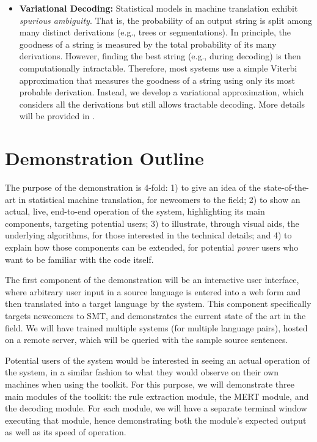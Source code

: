 \documentclass[11pt]{article}
\begin{document}
\begin{itemize}
\item \textbf{Variational Decoding:} Statistical models in machine translation exhibit \emph{spurious ambiguity}. That is, the probability of an output string is split among many distinct derivations (e.g., trees or segmentations).  In principle, the goodness of a string is measured by the total probability of its many derivations.  However, finding the best string (e.g., during decoding) is then computationally intractable. Therefore, most systems use a simple Viterbi approximation that measures the goodness of a string using only its most probable derivation.  Instead, we develop a variational approximation, which considers all the derivations but still allows tractable decoding.  More details will be provided in .
\end{itemize}

\section{Demonstration Outline}

The purpose of the demonstration is 4-fold: 1) to give an idea of the
state-of-the-art in statistical machine translation, for newcomers to the
field; 2) to show an actual, live, end-to-end operation of the system,
highlighting its main components, targeting potential users; 3) to illustrate,
through visual aids, the underlying algorithms, for those interested in the
technical details; and 4) to explain how those components can be extended, for
potential \emph{power} users who want to be familiar with the code itself.

The first component of the demonstration will be an interactive user interface,
where arbitrary user input in a source language is entered into a web form and
then translated into a target language by the system.  This component
specifically targets newcomers to SMT, and demonstrates the current state of
the art in the field.  We will have trained multiple systems (for multiple
language pairs), hosted on a remote server, which will be queried with the
sample source sentences.

Potential users of the system would be interested in seeing an actual operation
of the system, in a similar fashion to what they would observe on their own
machines when using the toolkit.  For this purpose, we will demonstrate three
main modules of the toolkit: the rule extraction module, the MERT module, and
the decoding module.  For each module, we will have a separate terminal window
executing that module, hence demonstrating both the module's expected output as
well as its speed of operation.
\end{document}
